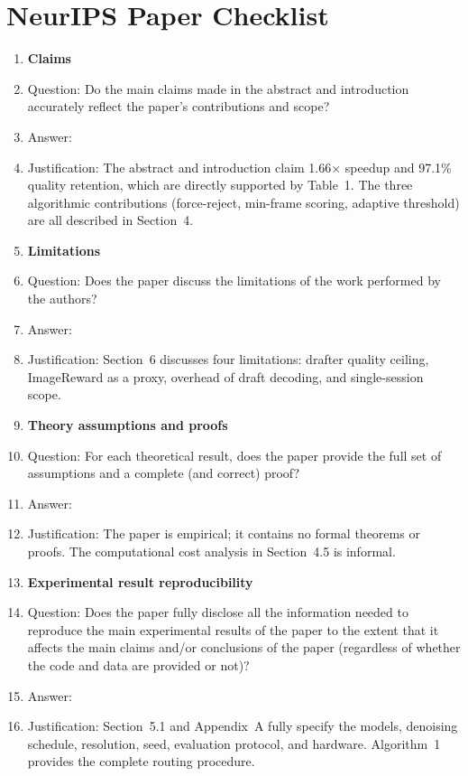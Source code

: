 \section*{NeurIPS Paper Checklist}

\begin{enumerate}

\item {\bf Claims}
    \item[] Question: Do the main claims made in the abstract and introduction accurately reflect the paper's contributions and scope?
    \item[] Answer: \answerYes{}
    \item[] Justification: The abstract and introduction claim 1.66$\times$ speedup and 97.1\% quality retention, which are directly supported by Table~1. The three algorithmic contributions (force-reject, min-frame scoring, adaptive threshold) are all described in Section~4.

\item {\bf Limitations}
    \item[] Question: Does the paper discuss the limitations of the work performed by the authors?
    \item[] Answer: \answerYes{}
    \item[] Justification: Section~6 discusses four limitations: drafter quality ceiling, ImageReward as a proxy, overhead of draft decoding, and single-session scope.

\item {\bf Theory assumptions and proofs}
    \item[] Question: For each theoretical result, does the paper provide the full set of assumptions and a complete (and correct) proof?
    \item[] Answer: \answerNA{}
    \item[] Justification: The paper is empirical; it contains no formal theorems or proofs. The computational cost analysis in Section~4.5 is informal.

    \item {\bf Experimental result reproducibility}
    \item[] Question: Does the paper fully disclose all the information needed to reproduce the main experimental results of the paper to the extent that it affects the main claims and/or conclusions of the paper (regardless of whether the code and data are provided or not)?
    \item[] Answer: \answerYes{}
    \item[] Justification: Section~5.1 and Appendix~A fully specify the models, denoising schedule, resolution, seed, evaluation protocol, and hardware. Algorithm~1 provides the complete routing procedure.


\end{enumerate}
